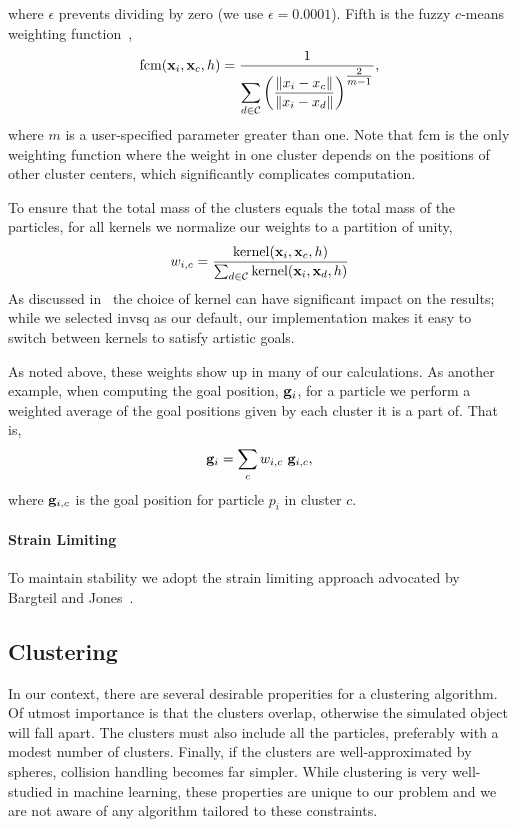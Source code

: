 \documentclass[review]{acmsiggraph}
\begin{document}
where $\epsilon$ prevents dividing by zero (we use $\epsilon = 0.0001$).
Fifth is the fuzzy $c$-means weighting function~\cite{Dunn:1973:AFR,Bezdek:1981:PRF},
\begin{equation}
\label{eq:fuzzycmeans}
\displaystyle \mathrm{fcm}(\mathit{\mathbf{x}}_i, \mathit{\mathbf{x}}_{c}, h) = \dfrac{1}{\displaystyle \sum_{d\in\mathcal{C}}\left(\dfrac{\|x_i - x_{c}\|}{\|x_i-x_{d}\|}\right)^{\tfrac{2}{m-1}}},
\end{equation}
where $m$ is a user-specified parameter greater than one.
Note that $\mathrm{fcm}$ is the only weighting function where the weight in one cluster depends on the positions of other cluster centers,
which significantly complicates computation.

To ensure that the total mass of the clusters equals the total mass of the particles, for all kernels we normalize our weights to a partition of unity,
\begin{equation}
\label{eq:weights}
w_{i,c} = \frac{\mathrm{kernel}(\mathit{\mathbf{x}}_i, \mathit{\mathbf{x}}_{c}, h)}{\sum_{d\in\mathcal{C}}\mathrm{kernel}(\mathit{\mathbf{x}}_i, \mathit{\mathbf{x}}_{d}, h)}
\end{equation}
As discussed in~ the choice of kernel can have significant impact on the results; while we selected
$\mathrm{invsq}$ as our default, our implementation makes it easy to switch between kernels to satisfy artistic goals.

As noted above, these weights show up in many of our calculations.  As another example,
when computing the goal position, $\mathit{\mathbf{g}}_i$, for a particle we perform a weighted
average of the goal positions given by each cluster it is a part of.  That is,
\begin{equation}
\mathit{\mathbf{g}}_i = \sum_c w_{i,c}~\mathit{\mathbf{g}}_{i,c},
\end{equation}
where $\mathit{\mathbf{g}}_{i,c}$ is the goal position for particle $p_i$ in cluster $c$.

\paragraph{Strain Limiting}
To maintain stability we adopt the strain limiting approach advocated by Bargteil and Jones~.

\subsection{Clustering}
In our context, there are several desirable properities for a clustering algorithm.  Of utmost importance is that the clusters overlap, 
otherwise the simulated object will fall apart.  The clusters must also include all the particles, preferably with a modest number of clusters.  
Finally, if the clusters are well-approximated by spheres, collision handling becomes far simpler.  While clustering is
very well-studied in machine learning, these properties are unique to our problem and we are not aware of any algorithm tailored to these
constraints.  
\end{document}
